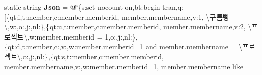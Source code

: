 \begin{DoxyCompactItemize}
static string {\bfseries Json} = @\char`\"{}\{\textquotesingle{}s\textquotesingle{}\+:\textquotesingle{}set nocount on\textquotesingle{},\textquotesingle{}bt\textquotesingle{}\+:\textquotesingle{}begin tran\textquotesingle{},\textquotesingle{}q\textquotesingle{}\+:\mbox{[}\{\textquotesingle{}qt\textquotesingle{}\+:\textquotesingle{}i\textquotesingle{},\textquotesingle{}t\textquotesingle{}\+:\textquotesingle{}member\textquotesingle{},\textquotesingle{}c\textquotesingle{}\+:\textquotesingle{}member.\+memberid, member.\+membername\textquotesingle{},\textquotesingle{}v\textquotesingle{}\+:\textquotesingle{}1, \textbackslash{}\textquotesingle{}구름빵\textbackslash{}\textquotesingle{}\textquotesingle{},\textquotesingle{}w\textquotesingle{}\+:\textquotesingle{}\textquotesingle{},\textquotesingle{}o\textquotesingle{}\+:\textquotesingle{}\textquotesingle{},\textquotesingle{}j\textquotesingle{}\+:\textquotesingle{}\textquotesingle{},\textquotesingle{}nl\textquotesingle{}\+:\textquotesingle{}\textquotesingle{}\},\{\textquotesingle{}qt\textquotesingle{}\+:\textquotesingle{}u\textquotesingle{},\textquotesingle{}t\textquotesingle{}\+:\textquotesingle{}member\textquotesingle{},\textquotesingle{}c\textquotesingle{}\+:\textquotesingle{}member.\+memberid, member.\+membername\textquotesingle{},\textquotesingle{}v\textquotesingle{}\+:\textquotesingle{}2, \textbackslash{}\textquotesingle{}프로젝트\textbackslash{}\textquotesingle{}\textquotesingle{},\textquotesingle{}w\textquotesingle{}\+:\textquotesingle{}member.\+memberid = 1\textquotesingle{},\textquotesingle{}o\textquotesingle{}\+:\textquotesingle{}\textquotesingle{},\textquotesingle{}j\textquotesingle{}\+:\textquotesingle{}\textquotesingle{},\textquotesingle{}nl\textquotesingle{}\+:\textquotesingle{}\textquotesingle{}\},\{\textquotesingle{}qt\textquotesingle{}\+:\textquotesingle{}d\textquotesingle{},\textquotesingle{}t\textquotesingle{}\+:\textquotesingle{}member\textquotesingle{},\textquotesingle{}c\textquotesingle{}\+:\textquotesingle{}\textquotesingle{},\textquotesingle{}v\textquotesingle{}\+:\textquotesingle{}\textquotesingle{},\textquotesingle{}w\textquotesingle{}\+:\textquotesingle{}member.\+memberid=1 and member.\+membername = \textbackslash{}\textquotesingle{}프로젝트\textbackslash{}\textquotesingle{}\textquotesingle{},\textquotesingle{}o\textquotesingle{}\+:\textquotesingle{}\textquotesingle{},\textquotesingle{}j\textquotesingle{}\+:\textquotesingle{}\textquotesingle{},\textquotesingle{}nl\textquotesingle{}\+:\textquotesingle{}\textquotesingle{}\},\{\textquotesingle{}qt\textquotesingle{}\+:\textquotesingle{}s\textquotesingle{},\textquotesingle{}t\textquotesingle{}\+:\textquotesingle{}member\textquotesingle{},\textquotesingle{}c\textquotesingle{}\+:\textquotesingle{}member.\+memberid, member.\+membername\textquotesingle{},\textquotesingle{}v\textquotesingle{}\+:\textquotesingle{}\textquotesingle{},\textquotesingle{}w\textquotesingle{}\+:\textquotesingle{}member.\+memberid=1, member.\+membername like 
\end{DoxyCompactItemize}
